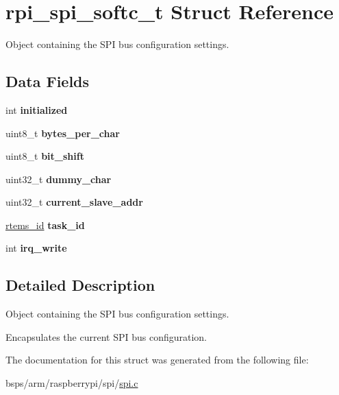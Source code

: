 \hypertarget{structrpi__spi__softc__t}{}\section{rpi\+\_\+spi\+\_\+softc\+\_\+t Struct Reference}
\label{structrpi__spi__softc__t}


Object containing the S\+PI bus configuration settings.  


\subsection*{Data Fields}
\begin{DoxyCompactItemize}
\item 
\mbox{\label{structrpi__spi__softc__t_af3bea751927917a2840b4e1e6790ef8d}} 
int {\bfseries initialized}
\item 
\mbox{\label{structrpi__spi__softc__t_a00140d4efb98eb9af02417eda774a46d}} 
uint8\+\_\+t {\bfseries bytes\+\_\+per\+\_\+char}
\item 
\mbox{\label{structrpi__spi__softc__t_ab3e2b621972e82001851c39986c32f54}} 
uint8\+\_\+t {\bfseries bit\+\_\+shift}
\item 
\mbox{\label{structrpi__spi__softc__t_aadb1b0573bae192ba6498723a47088b0}} 
uint32\+\_\+t {\bfseries dummy\+\_\+char}
\item 
\mbox{\label{structrpi__spi__softc__t_adf7b8459b1490f927248c475c95413c0}} 
uint32\+\_\+t {\bfseries current\+\_\+slave\+\_\+addr}
\item 
\mbox{\label{structrpi__spi__softc__t_a122fc3a6dc6ffe0f7f992a0a496cbe78}} 
\mbox{\hyperlink{group__ClassicTasks_gab20892b814dced7dd4e5b9bf42becd57}{rtems\+\_\+id}} {\bfseries task\+\_\+id}
\item 
\mbox{\label{structrpi__spi__softc__t_a58ef7f73b9d918416374c026899df64a}} 
int {\bfseries irq\+\_\+write}
\end{DoxyCompactItemize}


\subsection{Detailed Description}
Object containing the S\+PI bus configuration settings. 

Encapsulates the current S\+PI bus configuration. 

The documentation for this struct was generated from the following file\+:\begin{DoxyCompactItemize}
\item 
bsps/arm/raspberrypi/spi/\mbox{\hyperlink{arm_2raspberrypi_2spi_2spi_8c}{spi.\+c}}\end{DoxyCompactItemize}
